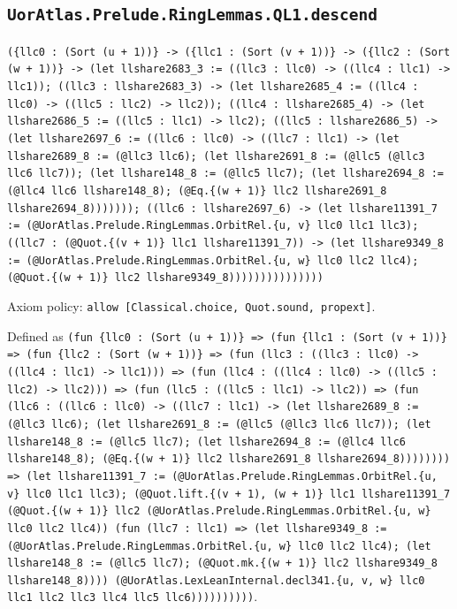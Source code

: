 \documentclass[11pt]{article}
\begin{document}
\subsection*{\texttt{UorAtlas.Prelude.RingLemmas.QL1.descend}}
\noindent\texttt{(\{llc0 : (Sort (u + 1))\} -> (\{llc1 : (Sort (v + 1))\} -> (\{llc2 : (Sort (w + 1))\} -> (let llshare2683\_3 := ((llc3 : llc0) -> ((llc4 : llc1) -> llc1)); ((llc3 : llshare2683\_3) -> (let llshare2685\_4 := ((llc4 : llc0) -> ((llc5 : llc2) -> llc2)); ((llc4 : llshare2685\_4) -> (let llshare2686\_5 := ((llc5 : llc1) -> llc2); ((llc5 : llshare2686\_5) -> (let llshare2697\_6 := ((llc6 : llc0) -> ((llc7 : llc1) -> (let llshare2689\_8 := (@llc3 llc6); (let llshare2691\_8 := (@llc5 (@llc3 llc6 llc7)); (let llshare148\_8 := (@llc5 llc7); (let llshare2694\_8 := (@llc4 llc6 llshare148\_8); (@Eq.\{(w + 1)\} llc2 llshare2691\_8 llshare2694\_8))))))); ((llc6 : llshare2697\_6) -> (let llshare11391\_7 := (@UorAtlas.Prelude.RingLemmas.OrbitRel.\{u, v\} llc0 llc1 llc3); ((llc7 : (@Quot.\{(v + 1)\} llc1 llshare11391\_7)) -> (let llshare9349\_8 := (@UorAtlas.Prelude.RingLemmas.OrbitRel.\{u, w\} llc0 llc2 llc4); (@Quot.\{(w + 1)\} llc2 llshare9349\_8)))))))))))))))}\par
\noindent Axiom policy: \texttt{allow [Classical.choice, Quot.sound, propext]}.\par
\noindent Defined as \texttt{(fun \{llc0 : (Sort (u + 1))\} => (fun \{llc1 : (Sort (v + 1))\} => (fun \{llc2 : (Sort (w + 1))\} => (fun (llc3 : ((llc3 : llc0) -> ((llc4 : llc1) -> llc1))) => (fun (llc4 : ((llc4 : llc0) -> ((llc5 : llc2) -> llc2))) => (fun (llc5 : ((llc5 : llc1) -> llc2)) => (fun (llc6 : ((llc6 : llc0) -> ((llc7 : llc1) -> (let llshare2689\_8 := (@llc3 llc6); (let llshare2691\_8 := (@llc5 (@llc3 llc6 llc7)); (let llshare148\_8 := (@llc5 llc7); (let llshare2694\_8 := (@llc4 llc6 llshare148\_8); (@Eq.\{(w + 1)\} llc2 llshare2691\_8 llshare2694\_8)))))))) => (let llshare11391\_7 := (@UorAtlas.Prelude.RingLemmas.OrbitRel.\{u, v\} llc0 llc1 llc3); (@Quot.lift.\{(v + 1), (w + 1)\} llc1 llshare11391\_7 (@Quot.\{(w + 1)\} llc2 (@UorAtlas.Prelude.RingLemmas.OrbitRel.\{u, w\} llc0 llc2 llc4)) (fun (llc7 : llc1) => (let llshare9349\_8 := (@UorAtlas.Prelude.RingLemmas.OrbitRel.\{u, w\} llc0 llc2 llc4); (let llshare148\_8 := (@llc5 llc7); (@Quot.mk.\{(w + 1)\} llc2 llshare9349\_8 llshare148\_8)))) (@UorAtlas.LexLeanInternal.decl341.\{u, v, w\} llc0 llc1 llc2 llc3 llc4 llc5 llc6))))))))))}.\par
\end{document}
